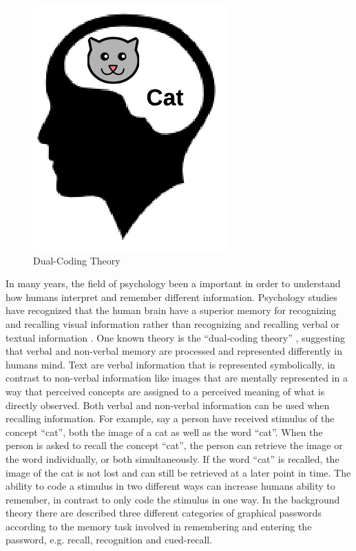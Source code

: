   \begin{figure}
    \vspace{-20pt}
    \begin{center}
      \includegraphics[scale=0.35]{pics/dualCoding.png}
    \end{center}
    \vspace{-20pt}
    \caption{Dual-Coding Theory}
    \vspace{-10pt}
  \end{figure}

  In many years, the field of psychology been a important in order to understand how humans interpret and remember different information. Psychology studies have recognized that the human brain have a superior memory for recognizing and recalling visual information rather than recognizing and recalling verbal or textual information \cite{DeAngeli}. One known theory is the ``dual-coding theory'' \cite{Biddle}, suggesting that verbal and non-verbal memory are processed and represented differently in humans mind. Text are verbal information that is represented symbolically, in contrast to non-verbal information like images that are mentally represented in a way that perceived concepts are assigned to a perceived meaning of what is directly observed. Both verbal and non-verbal information can be used when recalling information. For example, say a person have received stimulus of the concept ``cat'', both the image of a cat as well as the word ``cat''. When the person is asked to recall the concept ``cat'', the person can retrieve the image or the word individually, or both simultaneously. If the word ``cat'' is recalled, the image of the cat is not lost and can still be retrieved at a later point in time. The ability to code a stimulus in two different ways can increase humans ability to remember, in contrast to only code the stimulus in one way. In the background theory there are described three different categories of graphical passwords according to the memory task involved in remembering and entering the password, e.g. recall, recognition and cued-recall. 

